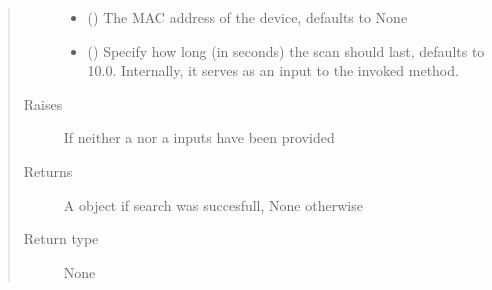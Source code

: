 \documentclass[letterpaper,10pt,english]{sphinxmanual}
\begin{document}
\begin{fulllineitems}
\begin{fulllineitems}
\begin{quote}
\begin{description}
\begin{itemize}
\item {} 
 (\sphinxstyleliteralemphasis{\sphinxupquote{, }}) \textendash{} The MAC address of the device, defaults to None

\item {} 
 (\sphinxstyleliteralemphasis{\sphinxupquote{, }}) \textendash{} Specify how long (in seconds) the scan should last, defaults to 10.0. Internally, it serves as an input to the invoked {\hyperref[\detokenize{PandaBot:PandaBot.PandaBotClient.scan}]{}} method.

\end{itemize}

\item[{Raises}] \leavevmode
{} \textendash{} If neither a  nor a  inputs have been provided

\item[{Returns}] \leavevmode
A {\hyperref[\detokenize{PandaBot:PandaBot.PandaBotDevice}]{}} object if search was succesfull, None otherwise

\item[{Return type}] \leavevmode
{\hyperref[\detokenize{PandaBot:PandaBot.PandaBotDevice}]{}} \textbar{} None

\end{description}\end{quote}

\end{fulllineitems}



\end{fulllineitems}
\end{document}
